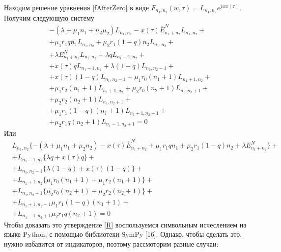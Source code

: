 Находим решение уравнения \eqref{fAfterZero} в виде $F_{n_{1}, n_{2}}(w,\tau)=L_{n_{1}, n_{2}}e^{jwx(\tau)}$. Получим следующую систему\\
\begin{equation*}
	\begin{split}
		&-(\lambda+\mu_{1}n_{1}+n_{2}\mu_{2})L_{n_{1}, n_{2}} 
		- x(\tau)\overline{E}_{n_{1}+n_{2}}^N L_{n_{1}, n_{2}}+\\
		&+ \mu_{1}r_{1}qn_{1}L_{n_{1}, n_{2}}+ \mu_{2}r_{1}(1-q)n_{2}L_{n_{1}, n_{2}}+\\
		&+ \lambda  E_{n_{1}+n_{2}}^N L_{n_{1}, n_{2}}+\lambda qL_{n_{1}-1, n_{2}}+\\
		&+ x(\tau) q  L_{n_{1}-1, n_{2}}+\lambda (1-q)L_{n_{1}, n_{2}-1} +\\
		&+ x(\tau) (1-q) L_{n_{1}, n_{2}-1}+ \mu_{1} r_{0} (n_{1}+1)L_{n_{1} +1 , n_{2}} +\\
		&+ \mu_{1} r_{2} (n_{1}+1) L_{n_{1} + 1, n_{2}}+ \mu_{2} r_{0} (n_{2}+1)L_{n_{1}, n_{2} + 1 }+\\
		& + \mu_{2} r_{2} (n_{2}+1) L_{n_{1}, n_{2} + 1}+\\
		&+\mu_{1} r_{1}(1-q)(n_{1}+1) L_{n_{1} +1 , n_{2}-1}+\\
		&+\mu_{2} r_{1}q (n_{2}+1)L_{n_{1} -1 , n_{2}+1}=0
	\end{split}
\end{equation*}
Или
\begin{equation}\label{sistForR}
	\begin{split}
		&L_{n_{1}, n_{2}}\{-(\lambda+\mu_{1}n_{1}+\mu_{2}n_{2}) - x(\tau)\overline{E}_{n_{1}+n_{2}}^N+ \mu_{1}r_{1}qn_{1}+ \mu_{2}r_{1}(1-q)n_{2}+ \lambda  E_{n_{1}+n_{2}}^N\}+\\
		&+L_{n_{1}-1, n_{2}}\{\lambda q+ x(\tau) q  \}+\\
		&+L_{n_{1}, n_{2}-1}\{\lambda (1-q) + x(\tau) (1-q) \}+\\
		&+L_{n_{1} +1 , n_{2}}\{ \mu_{1} r_{0}(n_{1}+1) + \mu_{1} r_{2} (n_{1}+1)\}+\\
		&+L_{n_{1}, n_{2} + 1 }\{ \mu_{2} r_{0} (n_{2}+1) + \mu_{2} r_{2} (n_{2}+1) \}+\\
		&+ L_{n_{1} +1 , n_{2}-1}\mu_{1} r_{1}(1-q)(n_{1}+1)+\\
		&+L_{n_{1} -1 , n_{2}+1}\mu_{2} r_{1}q(n_{2}+1) =0
	\end{split}
\end{equation}
Чтобы доказать это утверждение \eqref{R} воспользуемся символьным исчеслением на языке Python, с помощью библиотеки SymPy [16]. Однако, чтобы сделать это, нужно избавится от индикаторов, поэтому рассмоторим разные случаи:\\

